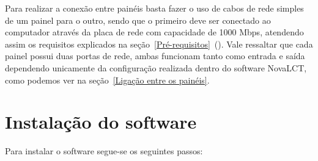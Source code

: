\documentclass[12pt, a4paper]{article}
\begin{document}
Para realizar a conexão entre painéis basta fazer o uso de cabos de rede simples de um painel para o outro, sendo que o primeiro deve ser conectado ao computador através da placa de rede com capacidade de 1000 Mbps, atendendo assim os requisitos explicados na seção~\ref{Pré-requisitos}~(). Vale ressaltar que cada painel possui duas portas de rede, ambas funcionam tanto como entrada e saída dependendo unicamente da configuração realizada dentro do software NovaLCT, como podemos ver na seção~\ref{Ligação entre os painéis}.

\newpage
\section{Instalação do software}\label{Instalação do software}
Para instalar o software segue-se os seguintes passos:
\end{document}
